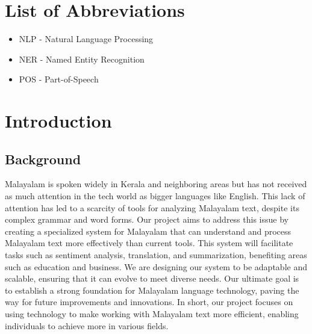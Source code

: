 \documentclass[12pt,a4paper,titlepage]{report}
\begin{document}
	
	\listoffigures
	\newpage
	
	
	\listoftables
	\newpage
	
	\chapter*{List of Abbreviations}
	\begin{itemize}
		\item NLP - Natural Language Processing
		\item NER - Named Entity Recognition
		\item POS - Part-of-Speech
	\end{itemize}
	
	
	
	\newpage
	
	\cleardoublepage
	
	\setcounter{page}{1}
	\chapter{Introduction}
	
	\section{Background}
	
	Malayalam is spoken widely in Kerala and neighboring areas but has not received as much attention in the tech world as bigger languages like English. This lack of attention has led to a scarcity of tools for analyzing Malayalam text, despite its complex grammar and word forms.
	\newline
	Our project aims to address this issue by creating a specialized system for Malayalam that can understand and process Malayalam text more effectively than current tools. This system will facilitate tasks such as sentiment analysis, translation, and summarization, benefiting areas such as education and business.
	\newline
	We are designing our system to be adaptable and scalable, ensuring that it can evolve to meet diverse needs. Our ultimate goal is to establish a strong foundation for Malayalam language technology, paving the way for future improvements and innovations.
	\newline
	In short, our project focuses on using technology to make working with Malayalam text more efficient, enabling individuals to achieve more in various fields.
	
\end{document}
